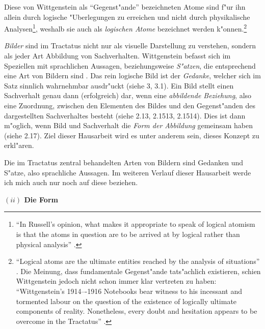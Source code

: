 \documentclass[a4paper, emulatestandardclasses, 12pt]{scrartcl}
\begin{document}
\begin{onehalfspace}
Diese von Wittgenstein als "`Gegenst"ande"' bezeichneten Atome sind f"ur ihn allein durch logische "Uberlegungen zu erreichen und nicht durch physikalische Analysen\footnote{"`In Russell's opinion, what makes it appropriate to speak of logical atomism is that the atoms in question are to be arrived at by logical rather than physical analysis"' \citep{sep-wittgenstein-atomism}.}, weshalb sie auch als \emph{logischen Atome} bezeichnet werden k"onnen.\footnote{"`Logical atoms are the ultimate entities reached by the analysis of situations"' \cite[S. 47]{frascolla2007understanding}. Die Meinung, dass fundamentale Gegenst"ande tats"achlich existieren, schien Wittgenstein jedoch nicht schon immer klar vertreten zu haben: "`Wittgenstein's 1914–-1916 Notebooks bear witness to his incessant and tormented labour on the question of the existence of logically ultimate components of reality. Nonetheless, every doubt and hesitation appears to be overcome in the Tractatus"' \cite[S. 48]{frascolla2007understanding}.} %

\emph{Bilder} sind im Tractatus nicht nur als visuelle Darstellung zu verstehen, sondern als jeder Art Abbildung von Sachverhalten. Wittgenstein befasst sich im Speziellen mit sprachlichen Aussagen, beziehungsweise \emph{S"atzen}, die entsprechend eine Art von Bildern sind \cite[vgl.][S. 66]{mcguinness2002approaches}. Das rein logische Bild ist der \emph{Gedanke}, welcher sich im Satz sinnlich wahrnehmbar ausdr"uckt (siehe 3, 3.1). Ein Bild stellt einen Sachverhalt genau dann (erfolgreich) dar, wenn eine \emph{abbildende Beziehung}, also eine Zuordnung, zwischen den Elementen des Bildes und den Gegenst"anden des dargestellten Sachverhaltes besteht (siehe 2.13, 2.1513, 2.1514). Dies ist dann m"oglich, wenn Bild und Sachverhalt die \emph{Form der Abbildung} gemeinsam haben (siehe 2.17). Ziel dieser Hausarbeit wird es unter anderem sein, dieses Konzept zu erkl"aren. 

Die im Tractatus zentral behandelten Arten von Bildern sind Gedanken und S"atze, also sprachliche Aussagen. Im weiteren Verlauf dieser Hausarbeit werde ich mich auch nur noch auf diese beziehen.


\vspace{5mm}
\noindent\textbf{$(ii)$ Die Form}	


\end{onehalfspace}
\end{document}
